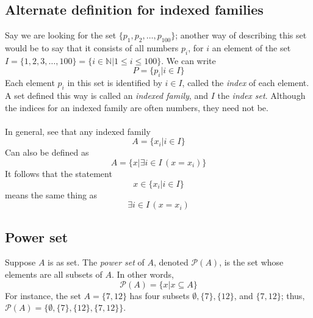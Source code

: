 \documentclass{report}
\theoremstyle{definition}
\begin{document}
\subsection{Alternate definition for indexed families}
Say we are looking for the set $\{p_1,p_2,\ldots,p_{100}\}$; another way of describing this set would be to say that it consists of all numbers $p_i$, for $i$ an element of the set
$I=\{1,2,3,\ldots,100\}=\{i\in\mathbb{N}|1\leq i\leq 100\}$. We can write
\begin{equation*}
P=\{p_i|i\in I\}
\end{equation*}
Each element $p_i$ in this set is identified by $i\in I$, called the \textit{index} of each element. A set defined this way is called an \textit{indexed family}, and $I$ the \textit{index set}.
Although the indices for an indexed family are often numbers, they need not be.\\
\vspace{1mm}\\
In general, see that any indexed family
\begin{equation*}
A=\{x_i|i\in I\}
\end{equation*}
Can also be defined as
\begin{equation*}
A=\{x|\exists i\in I\,(x=x_i)\}
\end{equation*}
It follows that the statement
\begin{equation*}
x\in\{x_i|i\in I\}
\end{equation*}
means the same thing as
\begin{equation*}
\exists i\in I\,(x=x_i)
\end{equation*}
\newpage

\subsection{Power set}
Suppose $A$ is as set. The \textit{power set} of $A$, denoted $\mathscr{P}(A)$, is the set whose elements are all subsets of $A$. In other words,
\begin{equation*}
\mathscr{P}(A)=\{x|x\subseteq A\}
\end{equation*}
For instance, the set $A=\{7,12\}$ has four subsets $\emptyset,\{7\},\{12\}$, and $\{7,12\}$;
thus, $\mathscr{P}(A)=\{\emptyset,\{7\},\{12\},\{7,12\}\}$. 
\end{document}
